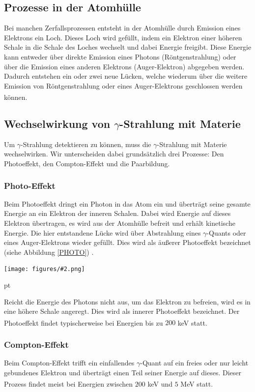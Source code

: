 \documentclass[12pt,listof=totoc]{scrartcl}
\newcommand{\gra}[3][0.7]{
	\begin{minipage}[h!]{\textwidth}
		\centering
		\texttt{[image: figures/\#2.png]}
		\captionof{figure}{#3}
	\end{minipage}
	\vskip 30 pt
}
\begin{document}
\subsection{Prozesse in der Atomhülle}\label{auger}
Bei manchen Zerfallsprozessen entsteht in der Atomhülle durch Emission eines Elektrons ein Loch. Dieses Loch wird gefüllt, indem ein Elektron einer höheren Schale in die Schale des Loches wechselt und dabei Energie freigibt. Diese Energie kann entweder über direkte Emission eines Photons (Röntgenstrahlung) oder über die Emission eines anderen Elektrons (Auger-Elektron) abgegeben werden. Dadurch entstehen ein oder zwei neue Lücken, welche wiederum über die weitere Emission von Röntgenstrahlung oder eines Auger-Elektrons geschlossen werden können.\textsuperscript{\cite{anleitung1}}

\subsection{Wechselwirkung von $\gamma$-Strahlung mit Materie}
Um $\gamma$-Strahlung detektieren zu können, muss die $\gamma$-Strahlung mit Materie wechselwirken. Wir unterscheiden dabei grundsätzlich drei Prozesse: Den Photoeffekt, den Compton-Effekt und die Paarbildung.
 \subsubsection{Photo-Effekt}
 Beim Photoeffekt dringt ein Photon in das Atom ein und überträgt seine gesamte Energie an ein Elektron der inneren Schalen. Dabei wird Energie auf dieses Elektron übertragen, es wird aus der Atomhülle befreit und erhält kinetische Energie. Die hier entstandene Lücke wird über Abstrahlung eines $\gamma$-Quants oder eines Auger-Elektrons wieder gefüllt. Dies wird als äußerer Photoeffekt bezeichnet (siehe Abbildung \ref{PHOTO}) .

  \gra{Photo}{Äußerer Photoeffekt\cite{staat} \label{PHOTO}}
  Reicht die Energie des Photons nicht aus, um das Elektron zu befreien, wird es in eine höhere Schale angeregt. Dies wird als innerer Photoeffekt bezeichnet.
  Der Photoeffekt findet typischerweise bei Energien bis zu $200$ keV statt.\textsuperscript{\cite{anleitung1}}
 \subsubsection{Compton-Effekt}
 Beim Compton-Effekt trifft ein einfallendes $\gamma$-Quant auf ein freies oder nur leicht gebundenes Elektron und überträgt einen Teil seiner Energie auf dieses. Dieser Prozess findet meist bei Energien zwischen $200$ keV und $5$ MeV statt.\textsuperscript{\cite{anleitung1}}
 
\end{document}
